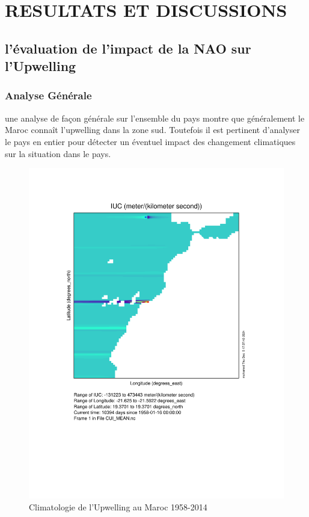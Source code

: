 \section{RESULTATS ET DISCUSSIONS}
\subsection{l'évaluation de l'impact de la NAO sur l'Upwelling}
\subsubsection{Analyse Générale}
une analyse de façon générale sur l’ensemble du pays montre que généralement le Maroc connaît l'upwelling dans la zone sud. Toutefois il est pertinent d'analyser le pays en entier pour détecter un éventuel impact des changement climatiques sur la situation dans le pays.
  
\begin{figure}[H]
\centering
\includegraphics[scale=0.5]{ncview_output.pdf}
\caption{Climatologie de l'Upwelling au Maroc  1958-2014}
\end{figure}


